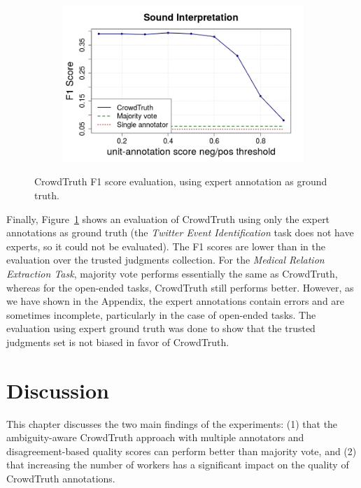 \begin{figure}[!tbh]
\begin{subfigure}{.5\textwidth}
\end{subfigure}%
\begin{subfigure}{.5\textwidth}
\includegraphics[width=\linewidth]{img/exp_eval_sounds.png}
\end{subfigure}
\caption{CrowdTruth F1 score evaluation, using expert annotation as ground truth.}
\label{fig:f1_exp}
\end{figure}

Finally, Figure~\ref{fig:f1_exp} shows an evaluation of CrowdTruth using only the expert annotations as ground truth (the \textit{Twitter Event Identification} task does not have experts, so it could not be evaluated). The F1 scores are lower than in the evaluation over the trusted judgments collection. For the \textit{Medical Relation Extraction Task}, majority vote performs essentially the same as CrowdTruth, whereas for the open-ended tasks, CrowdTruth still performs better. However, as we have shown in the Appendix, the expert annotations contain errors and are sometimes incomplete, particularly in the case of open-ended tasks. The evaluation using expert ground truth was done to show that the trusted judgments set is not biased in favor of CrowdTruth.


\section{Discussion}
\label{sec:discussion}

This chapter discusses the two main findings of the experiments: (1) that the ambiguity-aware CrowdTruth approach with multiple annotators and disagreement-based quality scores can perform better than majority vote, and (2) that increasing the number of workers has a significant impact on the quality of CrowdTruth annotations.

